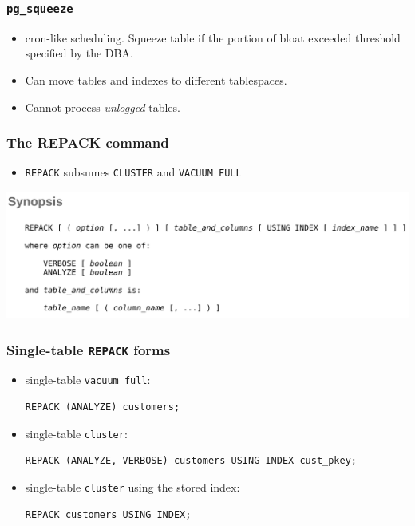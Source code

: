 \begin{frame}
  \frametitle{\texttt{pg\_squeeze}}
  \begin{itemize}
    \item cron-like scheduling. Squeeze table if the portion of bloat exceeded
      threshold specified by the DBA.
    \item Can move tables and indexes to different tablespaces.
    \item Cannot process \emph{unlogged} tables.
  \end{itemize}
\end{frame}


\begin{frame}
  \frametitle{The REPACK command}
  \begin{itemize}
    \item \texttt{REPACK} subsumes \texttt{CLUSTER} and \texttt{VACUUM FULL}
  \end{itemize}
  \includegraphics[width=\textwidth]{repack.png}
\end{frame}

\begin{frame}[fragile]
  \frametitle{Single-table \texttt{REPACK} forms}
  \begin{itemize}
    \item single-table \texttt{vacuum full}:
      \begin{lstlisting}
REPACK (ANALYZE) customers;
      \end{lstlisting}
    \item single-table \texttt{cluster}:
      \begin{lstlisting}
REPACK (ANALYZE, VERBOSE) customers USING INDEX cust_pkey;
      \end{lstlisting}
    \item single-table \texttt{cluster} using the stored index:
      \begin{lstlisting}
REPACK customers USING INDEX;
      \end{lstlisting}
  \end{itemize}
\end{frame}

